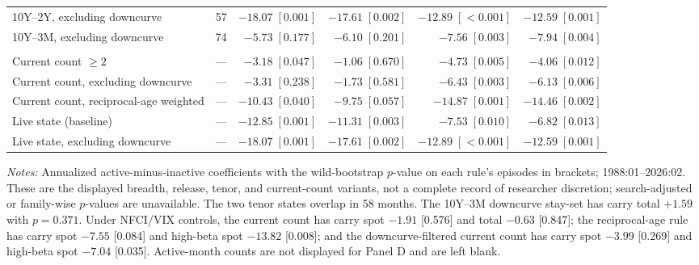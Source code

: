 \begin{table}[H]
{\begin{tabular}{lrrrrr}
10Y--2Y, excluding downcurve & 57 & $-18.07\;[0.001]$ & $-17.61\;[0.002]$ & $-12.89\;[<0.001]$ & $-12.59\;[0.001]$ \\
10Y--3M, excluding downcurve & 74 & $-5.73\;[0.177]$ & $-6.10\;[0.201]$ & $-7.56\;[0.003]$ & $-7.94\;[0.004]$ \\
\addlinespace
\multicolumn{6}{l}{\emph{Panel D: current-count repairs}} \\
Current count $\geq2$ & --- & $-3.18\;[0.047]$ & $-1.06\;[0.670]$ & $-4.73\;[0.005]$ & $-4.06\;[0.012]$ \\
Current count, excluding downcurve & --- & $-3.31\;[0.238]$ & $-1.73\;[0.581]$ & $-6.43\;[0.003]$ & $-6.13\;[0.006]$ \\
Current count, reciprocal-age weighted & --- & $-10.43\;[0.040]$ & $-9.75\;[0.057]$ & $-14.87\;[0.001]$ & $-14.46\;[0.002]$ \\
Live state (baseline) & --- & $-12.85\;[0.001]$ & $-11.31\;[0.003]$ & $-7.53\;[0.010]$ & $-6.82\;[0.013]$ \\
Live state, excluding downcurve & --- & $-18.07\;[0.001]$ & $-17.61\;[0.002]$ & $-12.89\;[<0.001]$ & $-12.59\;[0.001]$ \\
\bottomrule
\end{tabular}%
}

\begin{minipage}{0.98\textwidth}
\footnotesize\emph{Notes:} Annualized active-minus-inactive coefficients with the wild-bootstrap $p$-value on each rule's episodes in brackets; 1988:01--2026:02. These are the displayed breadth, release, tenor, and current-count variants, not a complete record of researcher discretion; search-adjusted or family-wise $p$-values are unavailable. The two tenor states overlap in 58 months. The 10Y--3M downcurve stay-set has carry total $+1.59$ with $p=0.371$. Under NFCI/VIX controls, the current count has carry spot $-1.91$ [0.576] and total $-0.63$ [0.847]; the reciprocal-age rule has carry spot $-7.55$ [0.084] and high-beta spot $-13.82$ [0.008]; and the downcurve-filtered current count has carry spot $-3.99$ [0.269] and high-beta spot $-7.04$ [0.035]. Active-month counts are not displayed for Panel D and are left blank.
\end{minipage}
\end{table}
